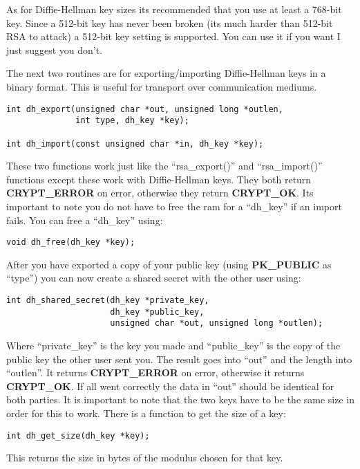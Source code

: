 \documentclass{book}
\begin{document}
As for Diffie-Hellman key sizes its recommended that you use at least a 768-bit key.  Since a 512-bit key has never been broken (its much
harder than 512-bit RSA to attack) a 512-bit key setting is supported.  You can use it if you want I just suggest you don't.

The next two routines are for exporting/importing Diffie-Hellman keys in a binary format.  This is useful for transport
over communication mediums.  

 
\begin{verbatim}
int dh_export(unsigned char *out, unsigned long *outlen, 
              int type, dh_key *key);

int dh_import(const unsigned char *in, dh_key *key);
\end{verbatim}

These two functions work just like the ``rsa\_export()'' and ``rsa\_import()'' functions except these work with 
Diffie-Hellman keys.  They both return {\bf CRYPT\_ERROR} on error, otherwise they return {\bf CRYPT\_OK}.   
Its important to note you do not have to free the ram for a ``dh\_key'' if an import fails.  You can free a 
``dh\_key'' using:
\begin{verbatim}
void dh_free(dh_key *key);
\end{verbatim}
After you have exported a copy of your public key (using {\bf PK\_PUBLIC} as ``type'') you can now create a shared secret 
with the other user using:
\begin{verbatim}
int dh_shared_secret(dh_key *private_key, 
                     dh_key *public_key, 
                     unsigned char *out, unsigned long *outlen);
\end{verbatim}

Where ``private\_key'' is the key you made and ``public\_key'' is the copy of the public key the other user sent you.  The result goes
into ``out'' and the length into ``outlen''.  It returns {\bf CRYPT\_ERROR} on error, otherwise it returns
{\bf CRYPT\_OK}.  If all went correctly the data in ``out'' should be identical for both parties.  It is important to
note that the two keys have to be the same size in order for this to work.  There is a function to get the size of a
key:
\begin{verbatim}
int dh_get_size(dh_key *key);
\end{verbatim}
This returns the size in bytes of the modulus chosen for that key.
\end{document}
